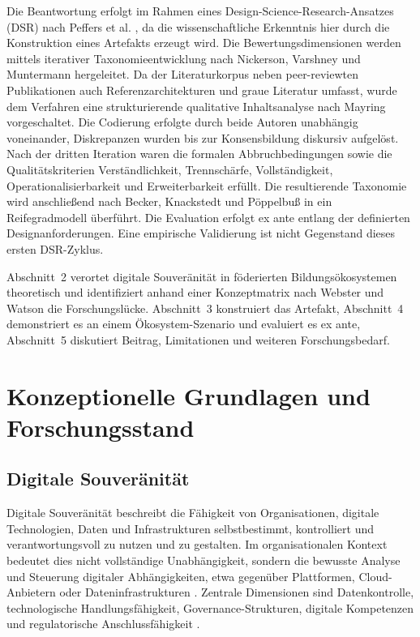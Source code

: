 \documentclass[10pt,a4paper]{article}
\begin{document}
Die Beantwortung erfolgt im Rahmen eines Design-Science-Research-Ansatzes (DSR) nach Peffers et al. \cite{Pe07}, da die wissenschaftliche Erkenntnis hier durch die Konstruktion eines Artefakts erzeugt wird. Die Bewertungsdimensionen werden mittels iterativer Taxonomieentwicklung nach Nickerson, Varshney und Muntermann \cite{NVM13} hergeleitet. Da der Literaturkorpus neben peer-reviewten Publikationen auch Referenzarchitekturen und graue Literatur umfasst, wurde dem Verfahren eine strukturierende qualitative Inhaltsanalyse nach Mayring \cite{Ma14} vorgeschaltet. Die Codierung erfolgte durch beide Autoren unabhängig voneinander, Diskrepanzen wurden bis zur Konsensbildung diskursiv aufgelöst. Nach der dritten Iteration waren die formalen Abbruchbedingungen sowie die Qualitätskriterien Verständlichkeit, Trennschärfe, Vollständigkeit, Operationalisierbarkeit und Erweiterbarkeit erfüllt. Die resultierende Taxonomie wird anschließend nach Becker, Knackstedt und Pöppelbuß \cite{BKP09} in ein Reifegradmodell überführt. Die Evaluation erfolgt ex ante entlang der definierten Designanforderungen. Eine empirische Validierung ist nicht Gegenstand dieses ersten DSR-Zyklus.

Abschnitt~2 verortet digitale Souveränität in föderierten Bildungsökosystemen theoretisch und identifiziert anhand einer Konzeptmatrix nach Webster und Watson \cite{WW02} die Forschungslücke. Abschnitt~3 konstruiert das Artefakt, Abschnitt~4 demonstriert es an einem Ökosystem-Szenario und evaluiert es ex ante, Abschnitt~5 diskutiert Beitrag, Limitationen und weiteren Forschungsbedarf.

\section{Konzeptionelle Grundlagen und Forschungsstand}

\subsection{Digitale Souveränität}

Digitale Souveränität beschreibt die Fähigkeit von Organisationen, digitale Technologien, Daten und Infrastrukturen selbstbestimmt, kontrolliert und verantwortungsvoll zu nutzen und zu gestalten. Im organisationalen Kontext bedeutet dies nicht vollständige Unabhängigkeit, sondern die bewusste Analyse und Steuerung digitaler Abhängigkeiten, etwa gegenüber Plattformen, Cloud-Anbietern oder Dateninfrastrukturen \cite{PT20,Fr24}. Zentrale Dimensionen sind Datenkontrolle, technologische Handlungsfähigkeit, Governance-Strukturen, digitale Kompetenzen und regulatorische Anschlussfähigkeit \cite{SHO24,PT20}.
\end{document}
